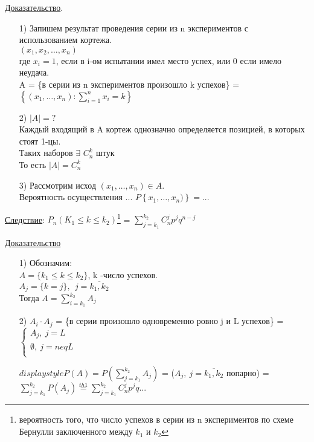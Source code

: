 \underline{Доказательство}.
\begin{enumerate}
	\item[1)]
	Запишем результат проведения серии из n экспериментов с использованием кортежа. \\
	$(x_1, x_2, \ldots , x_n)$ \\
	где  $x_i = 1$, если в i-ом испытании имел место успех, или 0 если имело неудача. \\
	A = \{в серии из n экспериментов произошло k успехов\} = $\left\{ (x_1, \ldots, x_n): \sum\limits_{i=1}^{n} x_i = k \right\}$
	
	\item[2)]
	$|A| = ?$ \\
	Каждый входящий в A кортеж однозначно определяется позицией, в которых стоят 1-цы. \\
	Таких наборов $\exists$ $C^k_n$ штук \\
	То есть $|A| = C^k_n$
	
	\item[3)]
	Рассмотрим исход $(x_1, \ldots , x_n) \in A$. \\
	Вероятность осуществления ...
	$P\left\{x_1, \ldots , x_n) \right\} = $...
\end{enumerate}

\underline{Следствие}:
$P_n(K_1 \leqslant k \leqslant k_2)$\footnote{вероятность того, что число успехов в серии из n экспериментов по схеме Бернулли заключенного между $k_1$ и $k_2$} = $\sum\limits_{j = k_1}^{k_2} C^j_n p^j q^{n-j}$

\underline{Доказательство}
\begin{enumerate}
	\item[1)]
	Обозначим: \\
	$A = \{k_1 \leqslant k \leqslant k_2\}$, k -число успехов. \\
	$A_j = \{k = j\}, \ \ j = \overline{k_1,k_2}$ \\
	Тогда $A = \sum\limits_{i = k_1}^{k_2} A_j$
	
	\item[2)]
	$A_i \cdot A_j$ = \{в серии произошло одновременно ровно j и L успехов\} = 
	$\begin{cases}
		A_j, \ j = L \\
		\emptyset, \ j =neq L \\
	\end{cases}$
	
	$displaystyle P(A) = P \left( \sum\limits_{j = k_1}^{k_2} A_j \right)$ = ($A_j, \ j = \overline{k_1, k_2}$ попарно) = $\displaystyle \sum\limits_{j = k_1}^{k_2} P(A_j) \stackrel{th1}{=} \sum\limits_{j = k_1}^{k_2} C^j_n p^j q ...$
\end{enumerate}

